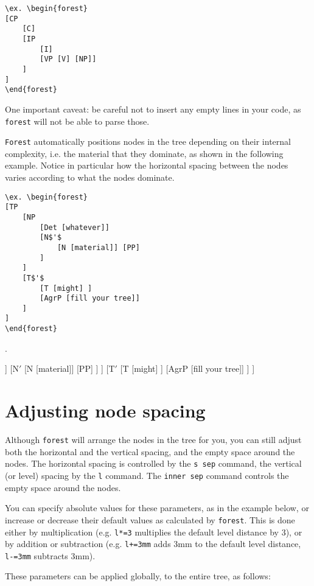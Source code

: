 \documentclass[english,12pt]{article}
\begin{document}
\begin{lstlisting}[basicstyle=\ttfamily,basewidth=0.5em]
\ex. \begin{forest}
[CP 
	[C] 
	[IP 
		[I]
		[VP [V] [NP]]
	] 
]
\end{forest}
\end{lstlisting}
One important caveat: be careful not to insert any empty lines in your code, as \texttt{forest} will not be able to parse those.

\texttt{Forest} automatically positions nodes in the tree depending on their internal complexity, i.e. the material that they dominate, as shown in the following example. Notice in particular how the horizontal spacing between the nodes varies according to what the nodes dominate.

\begin{lstlisting}[basicstyle=\ttfamily,basewidth=0.5em]
\ex. \begin{forest}
[TP
	[NP
		[Det [whatever]]
		[N$'$
			[N [material]] [PP]
		]
	] 
	[T$'$
		[T [might] ] 
		[AgrP [fill your tree]] 
	]
]
\end{forest}
\end{lstlisting}

\ex. \begin{forest}
[TP
	[NP
		[Det [whatever]]
		[N$'$
			[N [material]] [PP]
		]
	] 
	[T$'$
		[T [might] ] 
		[AgrP [fill your tree]] 
	]
]
\end{forest}


\section{Adjusting node spacing}

Although \texttt{forest} will arrange the nodes in the tree for you, you can still adjust both the horizontal and the vertical spacing, and the empty space around the nodes. The horizontal spacing is controlled by the \texttt{s sep} command, the vertical (or level) spacing by the \texttt{l} command. The \texttt{inner sep} command controls the empty space around the nodes. 

You can specify absolute values for these parameters, as in the example below, or increase or decrease their default values as calculated by \texttt{forest}. This is done either by multiplication (e.g. \texttt{l*=3} multiplies the default level distance by 3), or by addition or subtraction (e.g. \texttt{l+=3mm} adds 3mm to the default level distance, \texttt{l-=3mm} subtracts 3mm). 

These parameters can be applied globally, to the entire tree, as follows:
\end{document}
